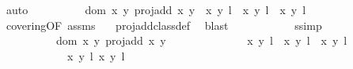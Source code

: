 \begin{isabellebody}
\ auto\isanewline
\ \ \ \ \ \ \ \ \isamarkupfalse%
\ {\isachardoublequoteopen}{\isacharparenleft}dom\ {\isacharparenleft}{\isasymlambda}{\isacharparenleft}x{\isacharcomma}\ y{\isacharparenright}{\isachardot}\ proj{\isacharunderscore}add\ x\ y{\isacharparenright}\ {\isasyminter}\ {\isacharbraceleft}{\isacharparenleft}{\isacharparenleft}x{\isacharcomma}\ y{\isacharparenright}{\isacharcomma}\ l{\isacharparenright}{\isacharbraceright}\ {\isasymtimes}\ {\isacharbraceleft}{\isacharparenleft}{\isacharparenleft}x{\isacharprime}{\isacharcomma}\ y{\isacharprime}{\isacharparenright}{\isacharcomma}\ l{\isacharprime}{\isacharparenright}{\isacharcomma}\ {\isacharparenleft}{\isasymtau}\ {\isacharparenleft}x{\isacharprime}{\isacharcomma}\ y{\isacharprime}{\isacharparenright}{\isacharcomma}\ l{\isacharprime}\ {\isacharplus}\ {}{\isacharparenright}{\isacharbraceright}{\isacharparenright}\ {\isasymnoteq}\ {\isacharbraceleft}{\isacharbraceright}{\isachardoublequoteclose}\isanewline
\ \ \ \ \ \ \ \ \ \ \isamarkupfalse%
\ covering{\isacharbrackleft}OF\ assms{\isacharbrackright}\ \isamarkupfalse%
\ {}\ proj{\isacharunderscore}add{\isacharunderscore}class{\isacharunderscore}def\ \isamarkupfalse%
\ blast\isanewline
\ \ \ \ \ \ \ \ \isamarkupfalse%
\ \isamarkupfalse%
\ s{\isacharunderscore}simp{\isacharcolon}\ \isanewline
\ \ \ \ \ \ \ \ \ \ {\isachardoublequoteopen}{\isacharparenleft}dom\ {\isacharparenleft}{\isasymlambda}{\isacharparenleft}x{\isacharcomma}\ y{\isacharparenright}{\isachardot}\ proj{\isacharunderscore}add\ x\ y{\isacharparenright}\ {\isasyminter}\ \isanewline
\ \ \ \ \ \ \ \ \ \ \ \ {\isacharbraceleft}{\isacharparenleft}{\isacharparenleft}x{\isacharcomma}\ y{\isacharparenright}{\isacharcomma}\ l{\isacharparenright}{\isacharbraceright}\ {\isasymtimes}\ {\isacharbraceleft}{\isacharparenleft}{\isacharparenleft}x{\isacharprime}{\isacharcomma}\ y{\isacharprime}{\isacharparenright}{\isacharcomma}\ l{\isacharprime}{\isacharparenright}{\isacharcomma}\ {\isacharparenleft}{\isasymtau}\ {\isacharparenleft}x{\isacharprime}{\isacharcomma}\ y{\isacharprime}{\isacharparenright}{\isacharcomma}\ l{\isacharprime}\ {\isacharplus}\ {}{\isacharparenright}{\isacharbraceright}{\isacharparenright}\ \isanewline
\ \ \ \ \ \ \ \ \ \ \ {\isacharequal}\ {\isacharbraceleft}{\isacharparenleft}{\isacharparenleft}{\isacharparenleft}x{\isacharcomma}\ y{\isacharparenright}{\isacharcomma}\ l{\isacharparenright}{\isacharcomma}{\isacharparenleft}{\isasymtau}\ {\isacharparenleft}x{\isacharprime}{\isacharcomma}\ y{\isacharprime}{\isacharparenright}{\isacharcomma}\ l{\isacharprime}\ {\isacharplus}\ {}{\isacharparenright}{\isacharparenright}{\isacharbraceright}{\isachardoublequoteclose}\ \isanewline

\end{isabellebody}
